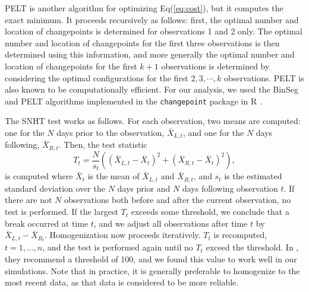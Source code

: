 \documentclass[12pt]{article}
\def\ni{\noindent}
\begin{document}
\begin{doublespacing}
PELT is another algorithm for optimizing Eq(\ref{eq:cost}), but it computes the exact minimum.  It proceeds recursively as follows: first, the optimal number and location of changepoints is determined for observations 1 and 2 only.  The optimal number and location of changepoints for the first three observations is then determined using this information, and more generally the optimal number and location of changepoints for the first $k+1$ observations is determined by considering the optimal configurations for the first $2, 3, \cdots, k$ observations.  PELT is also known to be computationally efficient.  For our analysis, we used the BinSeg and PELT algorithms implemented in the \texttt{changepoint} package in R \cite{killick14}.

The SNHT test works as follows.  For each observation, two means are computed: one for the $N$ days prior to the observation, $\bar{X}_{L,t}$, and one for the $N$ days following, $\bar{X}_{R,t}$.  Then, the test statistic
\begin{equation}
	T_t = \frac{N}{s_t}\left( (\bar{X}_{L,t}-\bar{X}_t)^2 + (\bar{X}_{R,t}-\bar{X}_t)^2\right),
	\label{eq:Hom}
\end{equation}
\ni is computed where $\bar{X}_t$ is the mean of $\bar{X}_{L,t}$ and $\bar{X}_{R,t}$, and $s_t$ is the estimated standard deviation over the $N$ days prior and $N$ days following observation $t$.  If there are not $N$ observations both before and after the current observation, no test is performed.  If the largest $T_t$ exceeds some threshold, we conclude that a break occurred at time $t$, and we adjust all observations after time $t$ by $\bar{X}_{L,t}-\bar{X}_{R_t}$.  Homogenization now proceeds iteratively.  $T_t$ is recomputed, $t=1,\ldots,n$, and the test is performed again until no $T_t$ exceed the threshold.  In \cite{haimberger07}, they recommend a threshold of 100, and we found this value to work well in our simulations.  Note that in practice, it is generally preferable to homogenize to the most recent data, as that data is considered to be more reliable.


\end{doublespacing}
\end{document}
